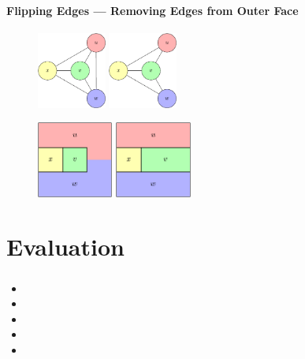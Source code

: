 \documentclass[t,18pt]{beamer}
\newcommand{\emdash}{---}
\begin{document}
\begin{frame}[c]
  \frametitle{}
  \framesubtitle{Flipping Edges \emdash{} Removing Edges from Outer Face}
  \begin{figure}
    \includegraphics[height=2.5cm]{../Thesis/Resources/FlipEdge-Example-Remove-1.pdf}
    \qquad\quad
    \includegraphics[height=2.5cm]{../Thesis/Resources/FlipEdge-Example-Remove-2.pdf}
  \end{figure}
  \begin{figure}
    \includegraphics[height=2.5cm]{../Thesis/Resources/FlipEdge-Example-Remove-3.pdf}
    \qquad
    \includegraphics[height=2.5cm]{../Thesis/Resources/FlipEdge-Example-Remove-4.pdf}
  \end{figure}
\end{frame}





\section{Evaluation}
\label{sect:evaluation}

\begin{frame}
  \frametitle{}
  \begin{itemize}
    \item {}
    \item {}
    \item {}
    \item {}
    \item {}
  \end{itemize}
\end{frame}
\end{document}
